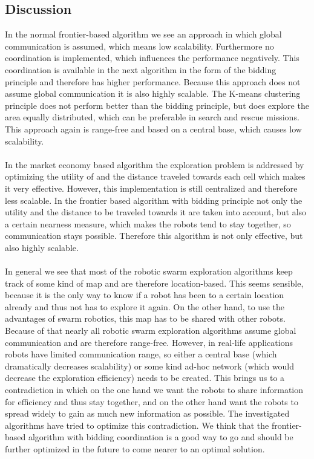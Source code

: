 \subsection{Discussion}
	In the normal frontier-based algorithm we see an approach in which global communication is assumed, which means low scalability. Furthermore no coordination is implemented, which influences the performance negatively. This coordination is available in the next algorithm in the form of the bidding principle and therefore has higher performance. Because this approach does not assume global communication it is also highly scalable. The K-means clustering principle does not perform better than the bidding principle, but does explore the area equally distributed, which can be preferable in search and rescue missions. This approach again is range-free and based on a central base, which causes low scalability.\\
	\\
	In the market economy based algorithm the exploration problem is addressed by optimizing the utility of and the distance traveled towards each cell which makes it very effective. However, this implementation is still centralized and therefore less scalable. In the frontier based algorithm with bidding principle not only the utility and the distance to be traveled towards it are taken into account, but also a certain nearness measure, which makes the robots tend to stay together, so communication stays possible. Therefore this algorithm is not only effective, but also highly scalable.\\
	\\
	In general we see that most of the robotic swarm exploration algorithms keep track of some kind of map and are therefore location-based.
	This seems sensible, because it is the only way to know if a robot has been to a certain location already and thus not has to explore it again.
	On the other hand, to use the advantages of swarm robotics, this map has to be shared with other robots.
	Because of that nearly all robotic swarm exploration algorithms assume global communication and are therefore range-free.
	However, in real-life applications robots have limited communication range, so either a central base (which dramatically decreases scalability) or some kind ad-hoc network (which would decrease the exploration efficiency) needs to be created.
	This brings us to a contradiction in which on the one hand we want the robots to share information for efficiency and thus stay together, and on the other hand want the robots to spread widely to gain as much new information as possible.
	The investigated algorithms have tried to optimize this contradiction. We think that the frontier-based algorithm with bidding coordination is a good way to go and should be further optimized in the future to come nearer to an optimal solution.


